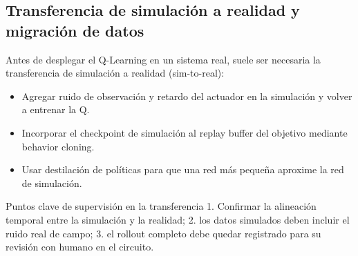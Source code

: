 \subsection{Transferencia de simulación a realidad y migración de datos}

Antes de desplegar el Q-Learning en un sistema real, suele ser necesaria la transferencia de simulación a realidad (sim-to-real):

\begin{itemize}
    \item Agregar ruido de observación y retardo del actuador en la simulación y volver a entrenar la Q.
    \item Incorporar el checkpoint de simulación al replay buffer del objetivo mediante behavior cloning.
    \item Usar destilación de políticas para que una red más pequeña aproxime la red de simulación.
\end{itemize}

\begin{importantbox}{Puntos clave de supervisión en la transferencia}
1. Confirmar la alineación temporal entre la simulación y la realidad; 2. los datos simulados deben incluir el ruido real de campo; 3. el rollout completo debe quedar registrado para su revisión con humano en el circuito.
\end{importantbox}
